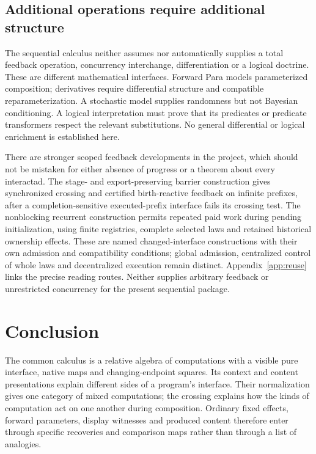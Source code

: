 \documentclass[11pt]{article}
\numberwithin{equation}{section}
\theoremstyle{definition}\newtheorem{definition}[theorem]{Definition}
\begin{document}
\subsection{Additional operations require additional structure}
The sequential calculus neither assumes nor automatically supplies a total
feedback operation, concurrency interchange, differentiation or a logical
doctrine. These are different mathematical interfaces. Forward Para models
parameterized composition; derivatives require differential structure and
compatible reparameterization. A stochastic model supplies randomness but
not Bayesian conditioning. A logical interpretation must prove that its
predicates or predicate transformers respect the relevant substitutions.
No general differential or logical enrichment is established here.

There are stronger scoped feedback developments in the project, which should
not be mistaken for either absence of progress or a theorem about every
interactad. The stage- and export-preserving barrier construction gives
synchronized crossing and certified birth-reactive feedback on infinite
prefixes, after a completion-sensitive executed-prefix interface fails its
crossing test. The nonblocking recurrent construction permits repeated paid
work during pending initialization, using finite registries, complete
selected laws and retained historical ownership effects. These are named
changed-interface constructions with their own admission and compatibility
conditions; global admission, centralized control of whole laws and
decentralized execution remain distinct. Appendix~\ref{app:reuse} links the
precise reading routes. Neither supplies arbitrary feedback or unrestricted
concurrency for the present sequential package.

\section{Conclusion}\label{sec:conclusion}
The common calculus is a relative algebra of computations with a visible pure
interface, native maps and changing-endpoint squares. Its context and content
presentations explain different sides of a program's interface. Their
normalization gives one category of mixed computations; the crossing explains
how the kinds of computation act on one another during composition. Ordinary
fixed effects, forward parameters, display witnesses and produced content
therefore enter through specific recoveries and comparison maps rather than
through a list of analogies.
\end{document}
